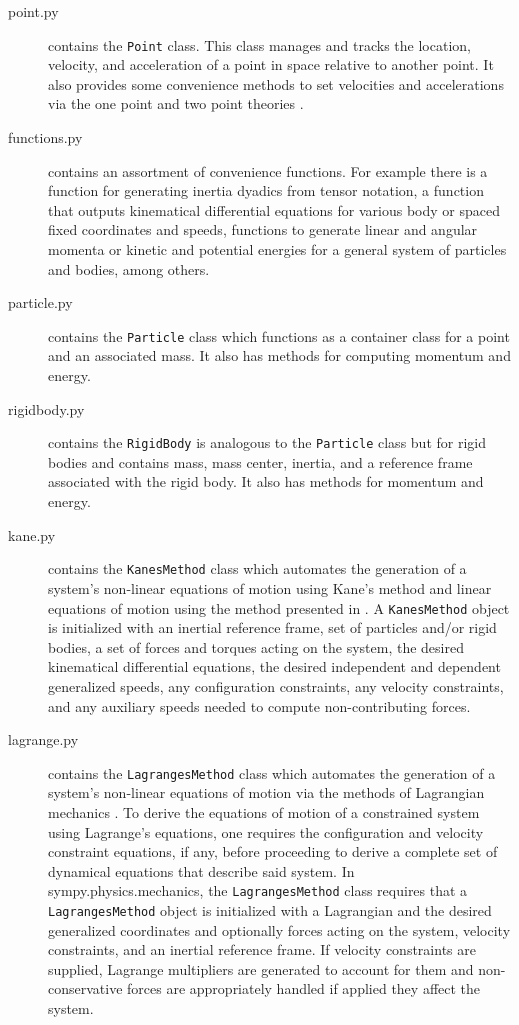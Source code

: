 \documentclass[twocolumn,10pt]{asme2e}
\begin{document}
\begin{description}
\begin{description}
    \end{description}
  \item[point.py] contains the \verb|Point| class. This class manages
    and tracks the location, velocity, and acceleration of a point in space
    relative to another point. It also provides some convenience methods to set
    velocities and accelerations via the one point and two point theories
    \cite{Kane1985}.
  \item[functions.py] contains an assortment of convenience functions. For
    example there is a function for generating inertia dyadics from tensor
    notation, a function that outputs kinematical differential equations for
    various body or spaced fixed coordinates and speeds, functions to generate
    linear and angular momenta or kinetic and potential energies for a general
    system of particles and bodies, among others.
  \item[particle.py] contains the \verb|Particle| class which functions as a
    container class for a point and an associated mass. It also has methods for
    computing momentum and energy.
  \item[rigidbody.py] contains the \verb|RigidBody| is analogous to the
    \verb|Particle| class but for rigid bodies and contains mass, mass center,
    inertia, and a reference frame associated with the rigid body. It also has
    methods for momentum and energy.
  \item[kane.py] contains the \verb|KanesMethod| class which automates the
    generation of a system's non-linear equations of motion using Kane's
    method\cite{Kane1985} and linear equations of motion using the method
    presented in \cite{Peterson2013}. A \verb|KanesMethod| object is initialized
    with an inertial reference frame, set of particles and/or rigid bodies, a
    set of forces and torques acting on the system, the desired kinematical
    differential equations, the desired independent and dependent generalized
    speeds, any configuration constraints, any velocity constraints, and any
    auxiliary speeds needed to compute non-contributing forces.
  \item[lagrange.py] contains the \verb|LagrangesMethod| class which automates
    the generation of a system's non-linear equations of motion via the methods
    of Lagrangian mechanics \cite{Crandall1968}. To derive the equations of
    motion of a constrained system using Lagrange's equations, one requires the
    configuration and velocity constraint equations, if any, before proceeding
    to derive a complete set of dynamical equations that describe said system.
    In sympy.physics.mechanics, the \verb|LagrangesMethod| class requires that
    a \verb|LagrangesMethod| object is initialized with a Lagrangian and the
    desired generalized coordinates and optionally forces acting on the system,
    velocity constraints, and an inertial reference frame. If velocity
    constraints are supplied, Lagrange multipliers are generated to account for
    them and non-conservative forces are appropriately handled if applied they
    affect the system.


\end{description}
\end{document}
